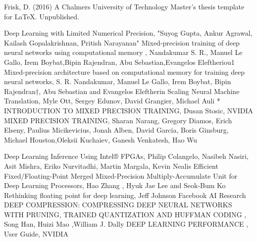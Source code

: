 \begin{thebibliography}{69}

 Frisk, D. (2016) A Chalmers University of Technology Master's thesis template for \LaTeX . Unpublished.


 Deep Learning with Limited Numerical Precision, "Suyog Gupta, Ankur Agrawal, Kailash Gopalakrishnan, Pritish Narayanan"
 Mixed-precision training of deep neural networks using computational memory , Nandakumar S. R., Manuel Le Gallo, Irem Boybat,Bipin Rajendran, Abu Sebastian,Evangelos Eleftheriou1
 Mixed-precision architecture based on computational memory for training deep neural networks, S. R. Nandakumar, Manuel Le Gallo, Irem Boybat, Bipin Rajendran†, Abu Sebastian and Evangelos Eleftherin
 Scaling Neural Machine Translation, Myle Ott, Sergey Edunov, David Grangier, Michael Auli
* INTRODUCTION TO MIXED PRECISION TRAINING, Dusan Stosic, NVIDIA
 MIXED PRECISION TRAINING, Sharan Narang, Gregory Diamos, Erich Elseny, Paulius Micikevicius, Jonah Alben, David Garcia, Boris Ginsburg, Michael Houston,Oleksii Kuchaiev, Ganesh Venkatesh, Hao Wu

  Deep Learning Inference Using Intel® FPGAs,  Philip Colangelo, Nasibeh Nasiri, Asit Mishra, Eriko Nurvitadhi, Martin Margala, Kevin Nealis
 Efficient Fixed/Floating-Point Merged Mixed-Precision Multiply-Accumulate Unit for Deep Learning Processors, Hao Zhang , Hyuk Jae Lee  and Seok-Bum Ko 
 Rethinking floating point for deep learning, Jeff Johnson Facebook AI Research
 DEEP COMPRESSION: COMPRESSING DEEP NEURAL NETWORKS WITH PRUNING, TRAINED QUANTIZATION AND HUFFMAN CODING , Song Han, Huizi Mao ,William J. Dally
 DEEP LEARNING PERFORMANCE , User Guide, NVIDIA



\end{thebibliography}
